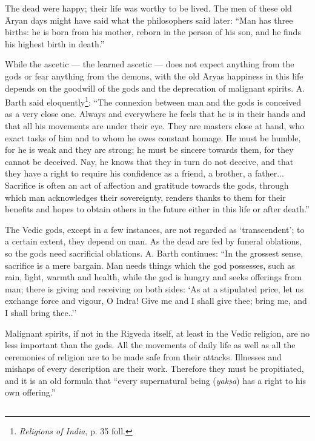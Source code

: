 \documentclass[a4paper, 11pt, oneside, english]{article}
\begin{document}
The dead were happy; their life was worthy to be lived. The men of these old Āryan days might have said what the philosophers said later: ``Man has three births: he is born from his mother, reborn in the person of his son, and he finds his highest birth in death.''

While the ascetic --- the learned ascetic --- does not expect anything from the gods or fear anything from the demons, with the old Āryas happiness in this life depends on the goodwill of the gods and the deprecation of malignant spirits. A. Barth said eloquently\footnote{\emph{Religions of India}, p. 35 foll.}: ``The connexion between man and the gods is conceived as a very close one. Always and everywhere he feels that he is in their hands and that all his movements are under their eye. They are masters close at hand, who exact tasks of him and to whom he owes constant homage. He must be humble, for he is weak and they are strong; he must be sincere towards them, for they cannot be deceived. Nay, he knows that they in turn do not deceive, and that they have a right to require his confidence as a friend, a brother, a father... Sacrifice is often an act of affection and gratitude towards the gods, through which man acknowledges their sovereignty, renders thanks to them for their benefits and hopes to obtain others in the future either in this life or after death.''

The Vedic gods, except in a few instances, are not regarded as `transcendent'; to a certain extent, they depend on man. As the dead are fed by funeral oblations, so the gods need sacrificial oblations. A. Barth continues: ``In the grossest sense, sacrifice is a mere bargain. Man needs things which the god possesses, such as rain, light, warmth and health, while the god is hungry and seeks offerings from man; there is giving and receiving on both sides: `As at a stipulated price, let us exchange force and vigour, O Indra! Give me and I shall give thee; bring me, and I shall bring thee..''

Malignant spirits, if not in the Rigveda itself, at least in the Vedic religion, are no less important than the gods. All the movements of daily life as well as all the ceremonies of religion are to be made safe from their attacks. Illnesses and mishaps of every description are their work. Therefore they must be propitiated, and it is an old formula that ``every supernatural being (\emph{yakṣa}) has a right to his own offering.''

\subsection{}
\end{document}
